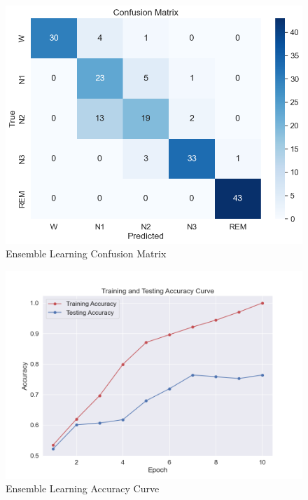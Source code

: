 \begin{figure}[H]
	\centering
	\includegraphics[width=\textwidth]{img/paper_1//Ensemble_confusion_matrix.png}
	\caption{Ensemble Learning Confusion Matrix}
\end{figure}

\begin{figure}[H]
	\centering
	\includegraphics[width=\textwidth]{img/paper_1//accuracy_curve.png}
	\caption{Ensemble Learning Accuracy Curve}
\end{figure}

